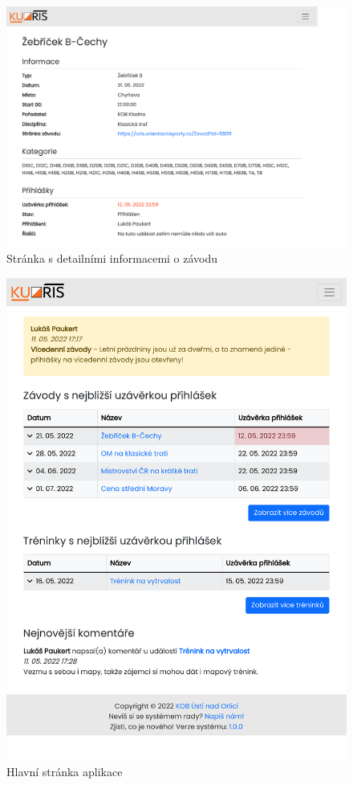 \begin{figure}[h]
    \caption{Stránka s detailními informacemi o závodu}
    \centering
    \includegraphics[width=0.995\linewidth, cfbox=kuorisgray 0.5pt 0pt]{images/appendix-detail.pdf}
\end{figure}

\begin{figure}[ht!]
    \caption{Hlavní stránka aplikace}
    \centering
    \includegraphics[width=0.995\linewidth, trim={0 1pt 0 0}, cfbox=kuorisgray 0.5pt 0pt]{images/appendix-homepage.pdf}
    \vspace{5cm}
\end{figure}
